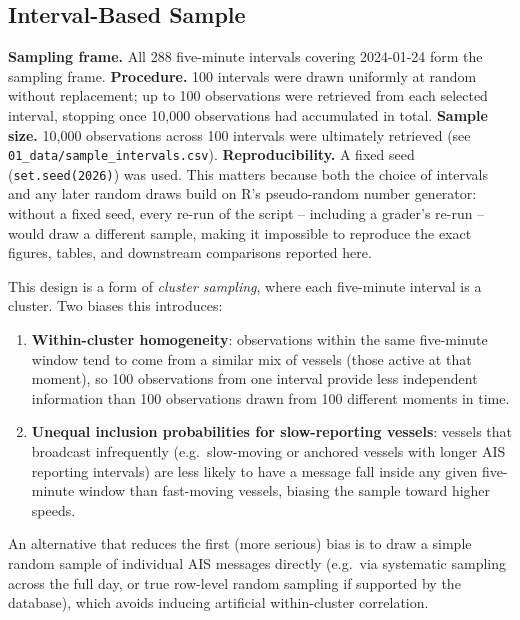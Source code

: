 \documentclass[11pt,a4paper]{article}
\begin{document}
\subsection{Interval-Based Sample}

\textbf{Sampling frame.} All 288 five-minute intervals covering 2024-01-24 form
the sampling frame. \textbf{Procedure.} 100 intervals were drawn uniformly at
random without replacement; up to 100 observations were retrieved from each
selected interval, stopping once 10{,}000 observations had accumulated in total.
\textbf{Sample size.} 10{,}000 observations across 100 intervals were
ultimately retrieved (see \texttt{01\_data/sample\_intervals.csv}).
\textbf{Reproducibility.} A fixed seed (\texttt{set.seed(2026)}) was used.
This matters because both the choice of intervals and any later random
draws build on R's pseudo-random number generator: without a fixed seed, every
re-run of the script -- including a grader's re-run -- would draw a different
sample, making it impossible to reproduce the exact figures, tables, and
downstream comparisons reported here.

This design is a form of \emph{cluster sampling}, where each five-minute
interval is a cluster. Two biases this introduces:

\begin{enumerate}[noitemsep]
  \item \textbf{Within-cluster homogeneity}: observations within the same
        five-minute window tend to come from a similar mix of vessels (those
        active at that moment), so 100 observations from one interval provide
        less independent information than 100 observations drawn from 100
        different moments in time.
  \item \textbf{Unequal inclusion probabilities for slow-reporting vessels}:
        vessels that broadcast infrequently (e.g.\ slow-moving or anchored
        vessels with longer AIS reporting intervals) are less likely to have a
        message fall inside any given five-minute window than fast-moving
        vessels, biasing the sample toward higher speeds.
\end{enumerate}

An alternative that reduces the first (more serious) bias is to draw a simple
random sample of individual AIS messages directly (e.g.\ via systematic
sampling across the full day, or true row-level random sampling if supported by
the database), which avoids inducing artificial within-cluster correlation.
\end{document}
